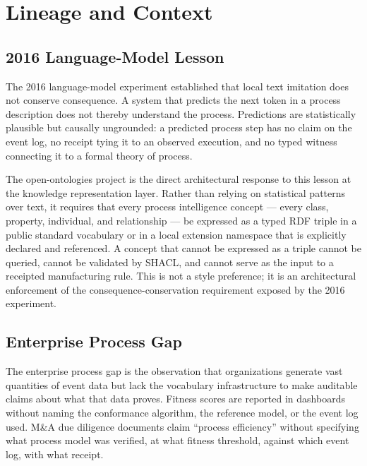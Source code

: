 
\section{Lineage and Context}
\label{sec:research-open-ontologies-lineage}

\subsection{2016 Language-Model Lesson}
\label{sec:research-open-ontologies-lm-lesson}

The 2016 language-model experiment established that local text imitation does not conserve
consequence. A system that predicts the next token in a process description does not thereby
understand the process. Predictions are statistically plausible but causally ungrounded: a
predicted process step has no claim on the event log, no receipt tying it to an observed
execution, and no typed witness connecting it to a formal theory of process.

The open-ontologies project is the direct architectural response to this lesson at the
knowledge representation layer. Rather than relying on statistical patterns over text, it
requires that every process intelligence concept --- every class, property, individual, and
relationship --- be expressed as a typed RDF triple in a public standard vocabulary or in a
local extension namespace that is explicitly declared and referenced. A concept that cannot
be expressed as a triple cannot be queried, cannot be validated by SHACL, and cannot serve
as the input to a receipted manufacturing rule. This is not a style preference; it is an
architectural enforcement of the consequence-conservation requirement exposed by the 2016
experiment.

\subsection{Enterprise Process Gap}
\label{sec:research-open-ontologies-enterprise-gap}

The enterprise process gap is the observation that organizations generate vast quantities of
event data but lack the vocabulary infrastructure to make auditable claims about what that
data proves. Fitness scores are reported in dashboards without naming the conformance algorithm,
the reference model, or the event log used. M\&A due diligence documents claim ``process
efficiency'' without specifying what process model was verified, at what fitness threshold,
against which event log, with what receipt.

